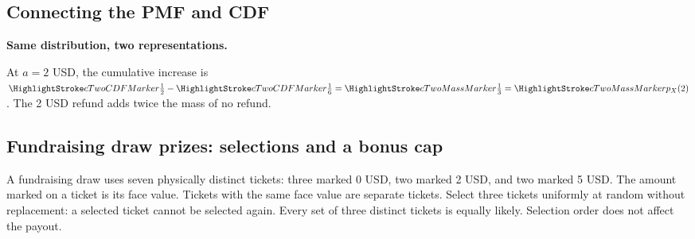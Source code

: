 \subsection*{Connecting the PMF and CDF}
\textbf{Same distribution, two representations.}
\begin{center}\end{center}
\cTwoConnectionReading
\par\smallskip At $a=2$ USD, the cumulative increase is $\cTwoCDFHL{\frac12}-\cTwoCDFHL{\frac16}=\cTwoMassHL{\frac13}=\cTwoMassHL{p_X(2)}$. The 2 USD refund adds twice the mass of no refund.
\ifGTenHighlights\else\par\vspace{3mm}\fi
{}


\clearpage
\subsection{Fundraising draw prizes: selections and a bonus cap}\label{prob:prize}
A fundraising draw uses seven physically distinct tickets: three marked 0 USD, two marked 2 USD, and two marked 5 USD. The amount marked on a ticket is its face value. Tickets with the same face value are separate tickets. Select three tickets uniformly at random without replacement: a selected ticket cannot be selected again. Every set of three distinct tickets is equally likely. Selection order does not affect the payout.

